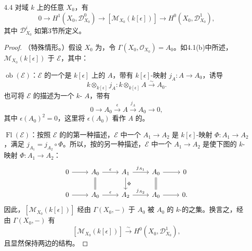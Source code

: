 \begin{SGAresult}{}{4.4}
对域 $k$ 上的任意 $X_0$，有
\[
0\longrightarrow H^1(X_0,\mathcal D^0_{X_0})\longrightarrow
[\mathcal M_{X_0}(k[\epsilon])]\longrightarrow H^0(X_0,\mathcal D^1_{X_0}),
\]
其中 $\mathcal D^i_{X_0}$ 如第3节所定义。
\end{SGAresult}
\begin{proof}
（特殊情形。）假设 $X_0$ 为，令 $\Gamma(X_0,\mathcal O_{X_0})=A_0$。如4.1(b)中所述， $\mathcal M_{X_0}(k[\epsilon])$ 于 $\mathcal E$，其中：

$\operatorname{ob}(\mathcal E)$：$\mathcal E$ 的一个是 $k[\epsilon]$ 上的 $A$，带有 $k[\epsilon]$-映射 $j_A:A\to A_0$，诱导
\[
k\otimes_{k[\epsilon]}j_A:k\otimes_{k[\epsilon]}A\xrightarrow\sim A_0.
\]
也可将 $\mathcal E$ 的描述为一个 $k$- $A$，带有
\[
0\longrightarrow A_0\xrightarrow{\epsilon}A\xrightarrow{j_A}A_0\longrightarrow0,
\]
其中 $\epsilon(A_0)^2=0$，这里将 $\epsilon(A_0)$ 看作 $A$ 的。

$\operatorname{Fl}(\mathcal E)$：按照 $\mathcal E$ 的的第一种描述，$\mathcal E$ 中一个 $A_1\to A_2$ 是 $k[\epsilon]$-映射 $\Phi:A_1\to A_2$，满足 $j_{A_1}=j_{A_2}\circ\Phi$。所以，按的另一种描述，$\mathcal E$ 中一个 $A_1\to A_2$ 是使下图的 $k$-映射 $\Phi:A_1\to A_2$：
\[
\begin{tikzcd}
0\arrow[r]&A_0\arrow[r,"\epsilon"]\arrow[d,equal]&A_1\arrow[r,"j_{A_1}"]\arrow[d,"\Phi"]&A_0\arrow[r]\arrow[d,equal]&0\\
0\arrow[r]&A_0\arrow[r,"\epsilon"]&A_2\arrow[r,"j_{A_2}"]&A_0\arrow[r]&0.
\end{tikzcd}
\]
因此，$[\mathcal M_{X_0}(k[\epsilon])]$ 经由 $\Gamma(X_0,-)$ 于 $A_0$ 被 $A_0$ 的 $k$-的之集。换言之，经由 $\Gamma(X_0,-)$ 有
\[
[\mathcal M_{X_0}(k[\epsilon])]\xrightarrow\sim H^0(X_0,\mathcal D^1_{X_0}),
\]
且显然保持两边的结构。


\end{proof}
